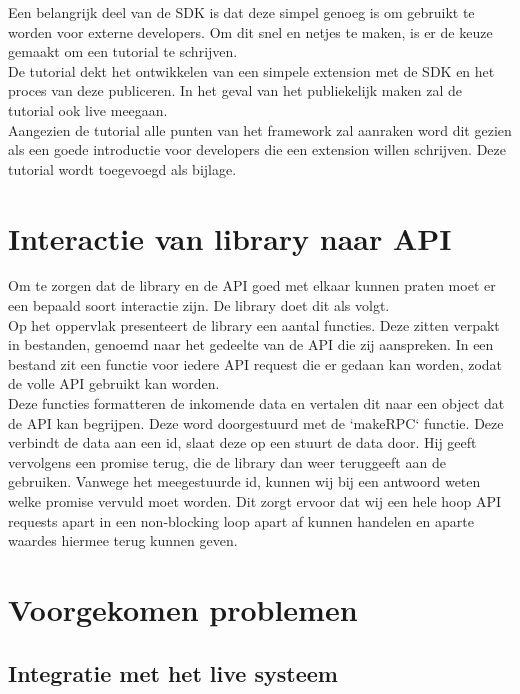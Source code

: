 Een belangrijk deel van de SDK is dat deze simpel genoeg is om gebruikt te worden voor externe developers. Om dit snel en netjes te maken, is er de keuze gemaakt om een tutorial te schrijven. \\

De tutorial dekt het ontwikkelen van een simpele extension met de SDK en het proces van deze publiceren. In het geval van het publiekelijk maken zal de tutorial ook live meegaan. \\

Aangezien de tutorial alle punten van het framework zal aanraken word dit gezien als een goede introductie voor developers die een extension willen schrijven. Deze tutorial wordt toegevoegd als bijlage. \\

\section{Interactie van library naar API}

Om te zorgen dat de library en de API goed met elkaar kunnen praten moet er een bepaald soort interactie zijn. De library doet dit als volgt. \\

Op het oppervlak presenteert de library een aantal functies. Deze zitten verpakt in bestanden, genoemd naar het gedeelte van de API die zij aanspreken. In een bestand zit een functie voor iedere API request die er gedaan kan worden, zodat de volle API gebruikt kan worden. \\ 

Deze functies formatteren de inkomende data en vertalen dit naar een object dat de API kan begrijpen. Deze word doorgestuurd met de `makeRPC` functie. Deze verbindt de data aan een id, slaat deze op een stuurt de data door. Hij geeft vervolgens een promise terug, die de library dan weer teruggeeft aan de gebruiken. Vanwege het meegestuurde id, kunnen wij bij een antwoord weten welke promise vervuld moet worden. Dit zorgt ervoor dat wij een hele hoop API requests apart in een non-blocking loop apart af kunnen handelen en aparte waardes hiermee terug kunnen geven. \\

\section{Voorgekomen problemen}

\subsection{Integratie met het live systeem}

